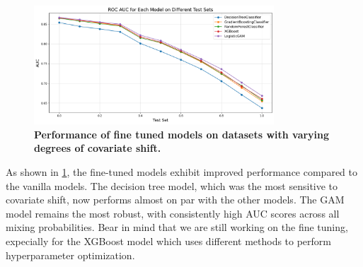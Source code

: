 \begin{figure}[H]
    \centering
    \includegraphics[width=0.8\textwidth]{assets/tuned.png} 
    \caption{\textbf{Performance of fine tuned models on datasets with varying degrees of covariate shift.}}
    \label{fig:tuned-models-perf}
\end{figure}

As shown in \cref{fig:tuned-models-perf}, the fine-tuned models exhibit improved performance compared to the vanilla models. The decision tree model, which was the most sensitive to covariate shift, now performs almost on par with the other models. The GAM model remains the most robust, with consistently high AUC scores across all mixing probabilities.
Bear in mind that we are still working on the fine tuning, expecially for the XGBoost model which uses different methods to perform hyperparameter optimization.
